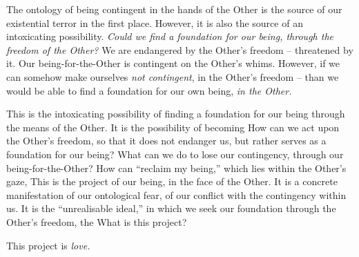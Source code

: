 The ontology of being contingent in the hands of the Other is the source of our existential terror in the first place. However, it is also the source of an intoxicating possibility. \emph{Could we find a foundation for our being, through the freedom of the Other?} We are endangered by the Other's freedom -- threatened by it. Our being-for-the-Other is contingent on the Other's whims. However, if we can somehow make ourselves \emph{not contingent}, in the Other's freedom -- than we would be able to find a foundation for our own being, \emph{in the Other.}

This is the intoxicating possibility of finding a foundation for our being through the means of the Other. It is the possibility of becoming  How can we act upon the Other's freedom, so that it does not endanger us, but rather serves as a foundation for our being? What can we do to lose our contingency, through our being-for-the-Other? How can \enquote{reclaim my being,} which lies within the Other's gaze,  This is the project of our being, in the face of the Other. It is a concrete manifestation of our ontological fear, of our conflict with the contingency within us. It is the \enquote{unrealisable ideal,} in which we seek our foundation through the Other's freedom, the  What is this project?

\noindent
This project is \emph{love.}